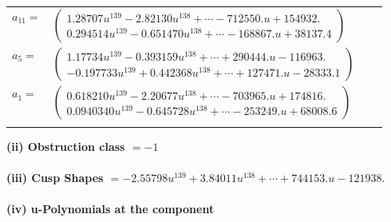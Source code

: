 \documentclass[1p]{elsarticle_modified}
\theoremstyle{definition}
\begin{document}
\begin{tabular}{m{7pt} m{180pt} m{7pt} m{180pt} }
\flushright $a_{11}=$&$\begin{pmatrix}1.28707 u^{139}-2.82130 u^{138}+\cdots-712550. u+154932.\\0.294514 u^{139}-0.651470 u^{138}+\cdots-168867. u+38137.4\end{pmatrix}$ \\
\flushright $a_{5}=$&$\begin{pmatrix}1.17734 u^{139}-0.393159 u^{138}+\cdots+290444. u-116963.\\-0.197733 u^{139}+0.442368 u^{138}+\cdots+127471. u-28333.1\end{pmatrix}$ \\
\flushright $a_{1}=$&$\begin{pmatrix}0.618210 u^{139}-2.20677 u^{138}+\cdots-703965. u+174816.\\0.0940340 u^{139}-0.645728 u^{138}+\cdots-253249. u+68008.6\end{pmatrix}$\\&\end{tabular}
\flushleft \textbf{(ii) Obstruction class $= -1$}\\~\\
\flushleft \textbf{(iii) Cusp Shapes $= -2.55798 u^{139}+3.84011 u^{138}+\cdots+744153. u-121938.$}\\~\\
\newpage\renewcommand{\arraystretch}{1}
\flushleft \textbf{(iv) u-Polynomials at the component}\newline \\
\end{document}
